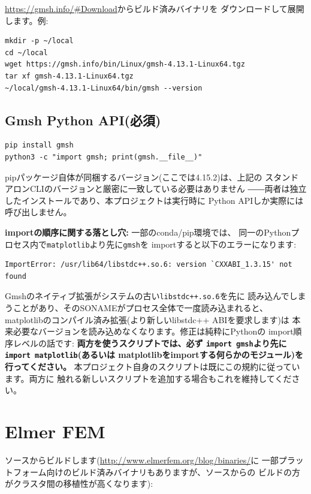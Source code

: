 \documentclass[11pt]{ltjsarticle}
\begin{document}
\url{https://gmsh.info/#Download}からビルド済みバイナリを
ダウンロードして展開します。例:

\begin{lstlisting}
mkdir -p ~/local
cd ~/local
wget https://gmsh.info/bin/Linux/gmsh-4.13.1-Linux64.tgz
tar xf gmsh-4.13.1-Linux64.tgz
~/local/gmsh-4.13.1-Linux64/bin/gmsh --version
\end{lstlisting}

\subsection{Gmsh Python API(必須)}

\begin{lstlisting}
pip install gmsh
python3 -c "import gmsh; print(gmsh.__file__)"
\end{lstlisting}

pipパッケージ自体が同梱するバージョン(ここでは4.15.2)は、上記の
スタンドアロンCLIのバージョンと厳密に一致している必要はありません
――両者は独立したインストールであり、本プロジェクトは実行時に
Python APIしか実際には呼び出しません。

\textbf{importの順序に関する落とし穴:} 一部のconda/pip環境では、
同一のPythonプロセス内で\texttt{matplotlib}より先に\texttt{gmsh}を
importすると以下のエラーになります:
\begin{lstlisting}
ImportError: /usr/lib64/libstdc++.so.6: version `CXXABI_1.3.15' not found
\end{lstlisting}
Gmshのネイティブ拡張がシステムの古い\texttt{libstdc++.so.6}を先に
読み込んでしまうことがあり、そのSONAMEがプロセス全体で一度読み込まれると、
matplotlibのコンパイル済み拡張(より新しいlibstdc++ ABIを要求します)は
本来必要なバージョンを読み込めなくなります。修正は純粋にPythonの
import順序レベルの話です: \textbf{両方を使うスクリプトでは、必ず
\texttt{import gmsh}より先に\texttt{import matplotlib}(あるいは
matplotlibをimportする何らかのモジュール)を行ってください。}
本プロジェクト自身のスクリプトは既にこの規約に従っています。両方に
触れる新しいスクリプトを追加する場合もこれを維持してください。

\section{Elmer FEM}

ソースからビルドします(\url{http://www.elmerfem.org/blog/binaries/}に
一部プラットフォーム向けのビルド済みバイナリもありますが、ソースからの
ビルドの方がクラスタ間の移植性が高くなります):
\end{document}
